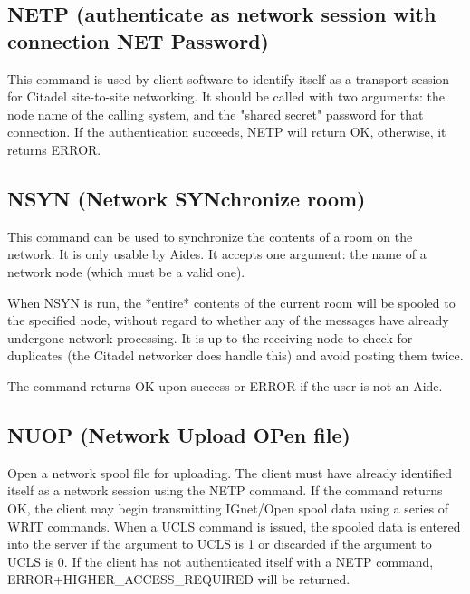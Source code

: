 \subsection{NETP (authenticate as network session with connection NET Password)}

 This command is used by client software to identify itself as a transport
session for Citadel site-to-site networking.  It should be called with
two arguments: the node name of the calling system, and the "shared secret"
password for that connection.  If the authentication succeeds, NETP will
return OK, otherwise, it returns ERROR.



\subsection{NSYN (Network SYNchronize room)}

 This command can be used to synchronize the contents of a room on the
network.  It is only usable by Aides.  It accepts one argument: the name of
a network node (which must be a valid one).

 When NSYN is run, the *entire* contents of the current room will be spooled
to the specified node, without regard to whether any of the messages have
already undergone network processing.  It is up to the receiving node to
check for duplicates (the Citadel networker does handle this) and avoid
posting them twice.

 The command returns OK upon success or ERROR if the user is not an Aide.



\subsection{NUOP (Network Upload OPen file)}

 Open a network spool file for uploading.  The client must have already
identified itself as a network session using the NETP command.  If the command
returns OK, the client may begin transmitting IGnet/Open spool data using
a series of WRIT commands.  When a UCLS command is issued, the spooled data
is entered into the server if the argument to UCLS is 1 or discarded if the
argument to UCLS is 0.  If the client has not authenticated itself with a
NETP command, ERROR+HIGHER_ACCESS_REQUIRED will be returned.



